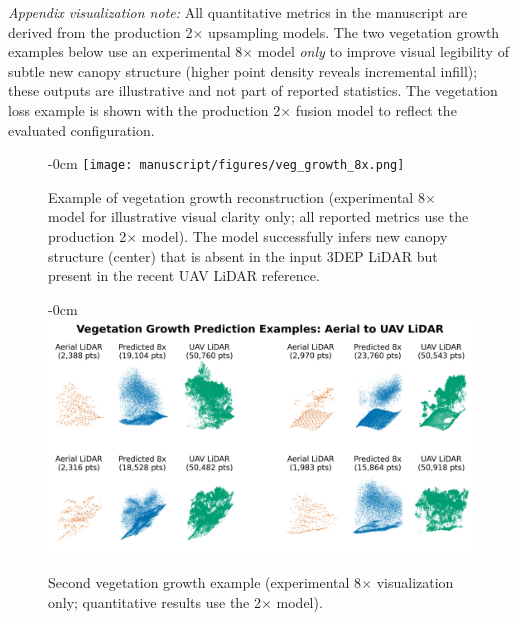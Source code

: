 \documentclass[remotesensing,article,submit,pdftex,moreauthors]{Definitions/mdpi}
\newenvironment{widefigure}[1][]{%
  \begin{figure}[#1]\begin{adjustwidth}{-\extralength}{0cm}\centering}{%
  \end{adjustwidth}\end{figure}}
\begin{document}
\noindent\textit{Appendix visualization note:} All quantitative metrics in the manuscript are derived from the production 2$\times$ upsampling models. The two vegetation growth examples below use an experimental 8$\times$ model \emph{only} to improve visual legibility of subtle new canopy structure (higher point density reveals incremental infill); these outputs are illustrative and not part of reported statistics. The vegetation loss example is shown with the production 2$\times$ fusion model to reflect the evaluated configuration.
\begin{widefigure}[H]
    \centering
    \texttt{[image: manuscript/figures/veg\_growth\_8x.png]}
  \caption{Example of vegetation growth reconstruction (experimental 8$\times$ model for illustrative visual clarity only; all reported metrics use the production 2$\times$ model). The model successfully infers new canopy structure (center) that is absent in the input 3DEP LiDAR but present in the recent UAV LiDAR reference.}
    \label{fig:appendix_growth1}
\end{widefigure}

\begin{widefigure}[H]
    \centering
    \includegraphics[width=1\linewidth]{manuscript/figures/veg_growth2_8x.png}
  \caption{Second vegetation growth example (experimental 8$\times$ visualization only; quantitative results use the 2$\times$ model).}
    \label{fig:appendix_growth2}
\end{widefigure}
\end{document}
